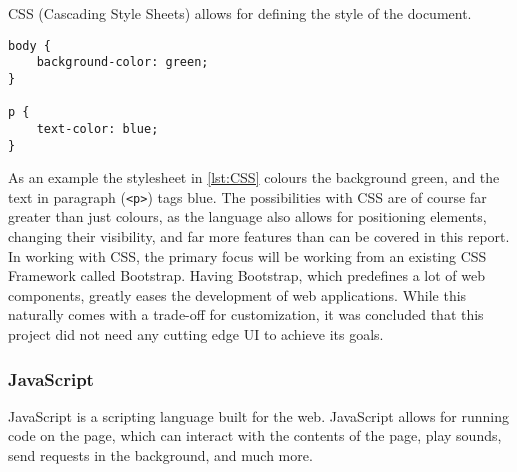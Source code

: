 CSS (Cascading Style Sheets) allows for defining the style of the document.
\begin{lstlisting}[caption={\color{red}indsæt caption tekst},label=lst:CSS]
body {
	background-color: green;
}

p {
	text-color: blue;
}
\end{lstlisting}
As an example the stylesheet in \cref{lst:CSS} colours the background green, and the text in paragraph (\texttt{<p>}) tags blue.
The possibilities with CSS are of course far greater than just colours, as the language also allows for positioning elements, changing their visibility, and far more features than can be covered in this report.\cite{nixonweb}
In working with CSS, the primary focus will be working from an existing CSS Framework called Bootstrap.
Having Bootstrap, which predefines a lot of web components, greatly eases the development of web applications.
While this naturally comes with a trade-off for customization, it was concluded that this project did not need any cutting edge UI to achieve its goals.

\subsubsection*{JavaScript}

JavaScript is a scripting language built for the web.
JavaScript allows for running code on the page, which can interact with the contents of the page, play sounds, send requests in the background, and much more.\cite{nixonweb}

